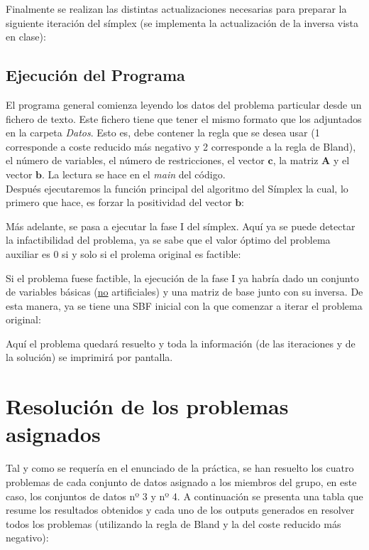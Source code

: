 \documentclass[11pt]{article}
\begin{document}
\noindent Finalmente se realizan las distintas actualizaciones necesarias para preparar la siguiente iteración del símplex (se implementa la actualización de la inversa vista en clase):


\subsection{Ejecución del Programa}
\noindent El programa general comienza leyendo los datos del problema particular
desde un fichero de texto. Este fichero tiene que tener el mismo formato que los
adjuntados en la carpeta \textit{Datos}. Esto es, debe contener la regla que se
desea usar (1 corresponde a coste reducido más negativo y 2 corresponde a la
regla de Bland), el número de variables, el número de restricciones, el vector
$\mathbf{c}$, la matriz $\mathbf{A}$ y el vector $\mathbf{b}$. La lectura se hace en el \textit{main} del código. \\

\noindent Después ejecutaremos la función principal del algoritmo del Símplex
la cual, lo primero que hace, es forzar la positividad del vector $\mathbf{b}$:

\noindent Más adelante, se pasa a ejecutar la fase I del símplex. Aquí ya se
puede detectar la infactibilidad del problema, ya se sabe que el valor
óptimo del problema auxiliar es $0$ si y solo si el prolema original es factible:

\noindent Si el problema fuese factible, la ejecución de la fase I ya habría
dado un conjunto de variables básicas (\underline{no} artificiales) y una matriz de
base junto con su inversa. De esta manera, ya se tiene una SBF inicial con la que comenzar a iterar el problema original:

\noindent Aquí el problema quedará resuelto y toda la información (de las iteraciones y de la solución) se imprimirá por pantalla.

\newpage
\section{Resolución de los problemas asignados}

\noindent Tal y como se requería en el enunciado de la práctica, se han resuelto los cuatro problemas de cada conjunto de datos asignado a los miembros del grupo, en este caso, los conjuntos de datos nº 3 y nº 4. A continuación se presenta una tabla que resume los resultados obtenidos y cada uno de los outputs generados en resolver todos los problemas (utilizando la regla de Bland y la del coste reducido más negativo):\\
\end{document}
